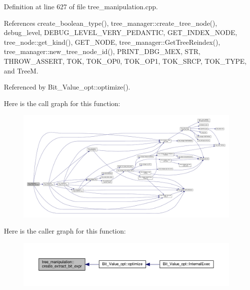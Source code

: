 Definition at line 627 of file tree\+\_\+manipulation.\+cpp.



References create\+\_\+boolean\+\_\+type(), tree\+\_\+manager\+::create\+\_\+tree\+\_\+node(), debug\+\_\+level, D\+E\+B\+U\+G\+\_\+\+L\+E\+V\+E\+L\+\_\+\+V\+E\+R\+Y\+\_\+\+P\+E\+D\+A\+N\+T\+IC, G\+E\+T\+\_\+\+I\+N\+D\+E\+X\+\_\+\+N\+O\+DE, tree\+\_\+node\+::get\+\_\+kind(), G\+E\+T\+\_\+\+N\+O\+DE, tree\+\_\+manager\+::\+Get\+Tree\+Reindex(), tree\+\_\+manager\+::new\+\_\+tree\+\_\+node\+\_\+id(), P\+R\+I\+N\+T\+\_\+\+D\+B\+G\+\_\+\+M\+EX, S\+TR, T\+H\+R\+O\+W\+\_\+\+A\+S\+S\+E\+RT, T\+OK, T\+O\+K\+\_\+\+O\+P0, T\+O\+K\+\_\+\+O\+P1, T\+O\+K\+\_\+\+S\+R\+CP, T\+O\+K\+\_\+\+T\+Y\+PE, and TreeM.



Referenced by Bit\+\_\+\+Value\+\_\+opt\+::optimize().

Here is the call graph for this function\+:
\nopagebreak
\begin{figure}[H]
\begin{center}
\leavevmode
\includegraphics[width=350pt]{d0/d99/classtree__manipulation_a81c9b97eea8118088f9631d222b443cf_cgraph}
\end{center}
\end{figure}
Here is the caller graph for this function\+:
\nopagebreak
\begin{figure}[H]
\begin{center}
\leavevmode
\includegraphics[width=350pt]{d0/d99/classtree__manipulation_a81c9b97eea8118088f9631d222b443cf_icgraph}
\end{center}
\end{figure}
\mbox{\label{classtree__manipulation_aa7404f53160cd6406f4d3b99f23fffab}} 
